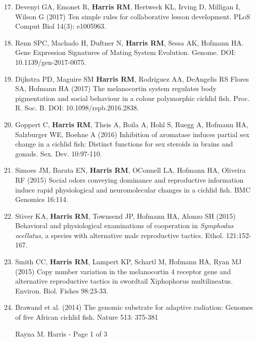 \documentclass[margin,line]{CV}
\newenvironment{benumerate}[1]{
    \let\oldItem\item
    \def\item{\addtocounter{enumi}{-2}\oldItem}
    \begin{enumerate}
    \setcounter{enumi}{#1}
    \addtocounter{enumi}{1}
}{
    \end{enumerate}
}
\begin{document}
\begin{resume}
\begin{benumerate}{16}
\setlength{\itemsep}{1pt}

\item Devenyi GA, Emonet R, {\bf Harris RM}, Hertweck KL, Irving D, Milligan I, Wilson G (2017) Ten simple rules for collaborative lesson development. PLoS Comput Biol 14(3): e1005963.

\item Renn SPC, Machado H, Duftner N, {\bf Harris RM}, Sessa AK, Hofmann HA. Gene Expression Signatures of Mating System Evolution. Genome. DOI: 10.1139/gen-2017-0075.

\item Dijkstra PD, Maguire SM {\bf Harris RM}, Rodriguez AA, DeAngelis RS Flores SA, Hofmann HA (2017) The melanocortin system regulates body pigmentation and social behaviour in a colour polymorphic cichlid fish. Proc. R. Soc. B. DOI: 10.1098/rspb.2016.2838.

\item Goppert C, {\bf Harris RM}, Theis A, Boila A, Hohl S, Ruegg A, Hofmann HA, Salzburger WE, Boehne A (2016) Inhibition of aromatase induces partial sex change in a cichlid fish: Distinct functions for sex steroids in brains and gonads. Sex. Dev. 10:97-110.

\item Simoes JM, Barata EN, {\bf Harris RM}, O\textsc{}Connell LA, Hofmann HA, Oliveira RF (2015) Social odors conveying dominance and reproductive information induce rapid physiological and neuromolecular changes in a cichlid fish. BMC Genomics 16:114. 

\item Stiver KA, {\bf Harris RM}, Townsend JP, Hofmann HA, Alonzo SH (2015) Behavioral and physiological examinations of cooperation in {\it Symphodus ocellatus}, a species with alternative male reproductive tactics. Ethol. 121:152-167.

\item Smith CC, {\bf Harris RM}, Lampert KP, Schartl M, Hofmann HA, Ryan MJ (2015) Copy number variation in the melanocortin 4 receptor gene and alternative reproductive tactics in swordtail Xiphophorus multilineatus. Environ. Biol. Fishes 98:23-33.

\item Brawand et al. (2014) The genomic substrate for adaptive radiation: Genomes of five African cichlid fish. Nature 513: 375-381

\vspace{0.4 cm}
{\centerline {Rayna M. Harris - Page 1 of 3}}
\newpage


\end{benumerate}
\end{resume}
\end{document}

